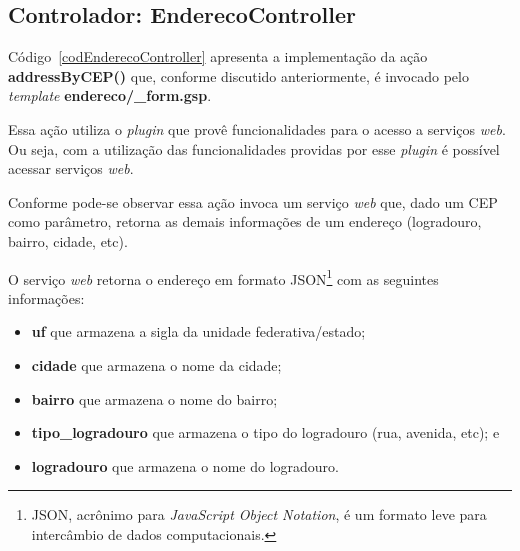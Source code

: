 \newpage

\subsection{Controlador: EnderecoController}

\vspace{0.5cm}

Código~\ref{codEnderecoController}  apresenta  a   implementação  da  ação  {\bf
  addressByCEP()} que,  conforme discutido  anteriormente, é invocado  pelo {\it
  template} {\bf endereco/\_form.gsp}. 

Essa  ação utiliza  o {\it  plugin} que  provê funcionalidades  para o  acesso a
serviços {\it web}.  Ou seja,  com a utilização das funcionalidades providas por
esse {\it plugin} é possível acessar serviços {\it web}.  

Conforme pode-se observar essa ação invoca um serviço {\it web} que, dado um CEP
como  parâmetro,  retorna as  demais  informações  de  um endereço  (logradouro,
bairro, cidade, etc). 

O serviço {\it  web} retorna o endereço em  formato JSON\footnote{JSON, acrônimo
  para {\it JavaScript  Object Notation}, é um formato  leve para intercâmbio de
  dados computacionais.} com as seguintes informações: 

\vspace{0.3cm}

\begin{itemize}

\item {\bf uf} que armazena a sigla da unidade federativa/estado;

\vspace{0.3cm}

\item {\bf cidade} que armazena o nome da cidade;

\vspace{0.3cm}

\item {\bf bairro} que armazena o nome do bairro;

\vspace{0.3cm}

\item {\bf  tipo\_logradouro} que armazena  o tipo do logradouro  (rua, avenida,
  etc); e

\vspace{0.3cm}

\item {\bf logradouro} que armazena o nome do logradouro.

\end{itemize}

